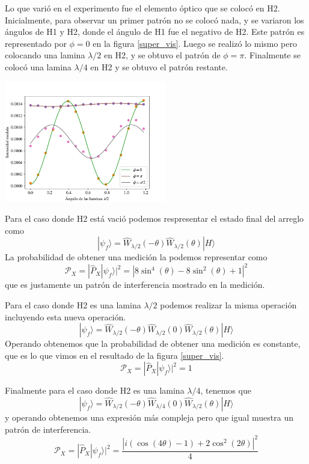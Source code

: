 \documentclass[onecolumn]{article}
\begin{document}
		Lo que varió en el experimento fue el elemento óptico que se colocó en H2. Inicialmente, para observar un primer patrón no se colocó nada, y se variaron los ángulos de H1 y H2, donde el ángulo de H1 fue el negativo de H2. Este patrón es representado por $\phi=0$ en la figura \ref{super_vis}. Luego se realizó lo mismo pero colocando una lamina $\lambda/2$ en H2, y se obtuvo el patrón de $\phi=\pi$. Finalmente se colocó una lamina $\lambda/4$ en H2 y se obtuvo el patrón restante.
		
		\begin{center}
			\includegraphics[width=200pt]{img/inter/super_vis.pdf}
			\label{super_vis}
		\end{center}

		Para el caso donde H2 está vació podemos respresentar el estado final del arreglo como
		$$
		| \psi_f\rangle=\hat{W}_{\lambda / 2}(-\theta)\hat{W}_{\lambda / 2}(\theta)|H\rangle
		$$
		La probabilidad de obtener una medición la podemos representar como
		$$
		\mathcal{P}_X=|\hat{P}_X | \psi_f\rangle|^ 2=\left|8 \sin ^4(\theta)-8 \sin ^2(\theta)+1\right|^2
		$$
		que es justamente un patrón de interferencia mostrado en la medición.
		
		Para el caso donde H2 es una lamina $\lambda/2$ podemos realizar la misma operación incluyendo esta nueva operación.
		$$
		| \psi_f\rangle=\hat{W}_{\lambda / 2}(-\theta)\hat{W}_{\lambda / 2}(0)\hat{W}_{\lambda / 2}(\theta)|H\rangle
		$$
		Operando obtenemos que la probabilidad de obtener una medición es constante, que es lo que vimos en el resultado de la figura \ref{super_vis}.
		$$
		\mathcal{P}_X=|\hat{P}_X | \psi_f\rangle|^ 2=1
		$$

		Finalmente para el caso donde H2 es una lamina $\lambda/4$, tenemos que
		$$
		| \psi_f\rangle=\hat{W}_{\lambda / 2}(-\theta)\hat{W}_{\lambda / 4}(0)\hat{W}_{\lambda / 2}(\theta)|H\rangle
		$$
		y operando obtenemos una expresión más compleja pero que igual muestra un patrón  de interferencia.
		$$
		\mathcal{P}_X=|\hat{P}_X | \psi_f\rangle|^ 2=\frac{\left|i(\cos (4 \theta)-1)+2 \cos ^2(2 \theta)\right|^2}{4}
		$$
\end{document}
